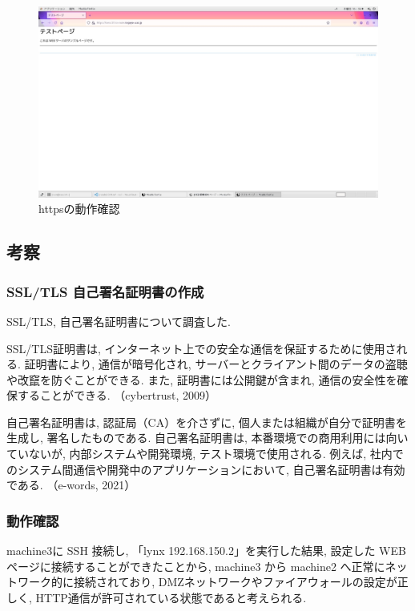 \documentclass{ltjsarticle} %
\begin{document}
\begin{figure}[H] %
  \centering
  \includegraphics[width=1.0\textwidth]{https.JPEG} %
  \caption{httpsの動作確認} %
  \label{fig:https} %
\end{figure}

\subsection{考察}

\subsubsection{SSL/TLS 自己署名証明書の作成}
SSL/TLS, 自己署名証明書について調査した. 

SSL/TLS証明書は, インターネット上での安全な通信を保証するために使用される. 
証明書により, 通信が暗号化され, サーバーとクライアント間のデータの盗聴や改竄を防ぐことができる. 
また, 証明書には公開鍵が含まれ, 通信の安全性を確保することができる. 
（cybertrust, 2009）

自己署名証明書は, 認証局（CA）を介さずに, 個人または組織が自分で証明書を生成し, 署名したものである. 
自己署名証明書は, 本番環境での商用利用には向いていないが, 
内部システムや開発環境, テスト環境で使用される. 
例えば, 社内でのシステム間通信や開発中のアプリケーションにおいて, 自己署名証明書は有効である. 
（e-words, 2021）


\subsubsection{動作確認}
machine3に SSH 接続し, 「lynx 192.168.150.2」を実行した結果, 設定した WEB ページに接続することができたことから, 
machine3 から machine2 へ正常にネットワーク的に接続されており, DMZネットワークやファイアウォールの設定が正しく, 
HTTP通信が許可されている状態であると考えられる. 
\end{document}
